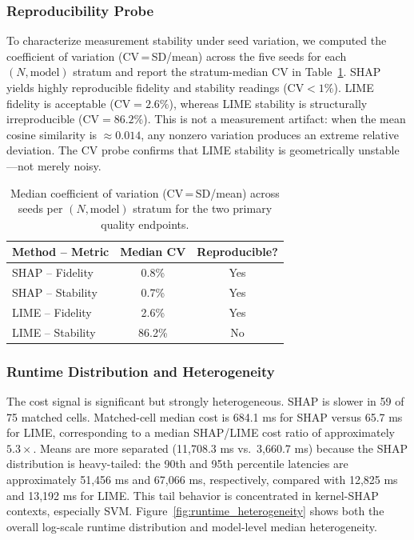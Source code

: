 \documentclass[twoside,11pt]{article}
\begin{document}
\subsubsection*{Reproducibility Probe}

To characterize measurement stability under seed variation, we computed
the coefficient of variation (CV\,=\,SD/mean) across the five seeds for
each $(N, \mathrm{model})$ stratum and report the stratum-median CV in
Table~\ref{tab:cv_reproducibility}. SHAP yields highly reproducible
fidelity and stability readings ($\mathrm{CV}<1\%$). LIME fidelity is
acceptable ($\mathrm{CV}=2.6\%$), whereas LIME stability is structurally
irreproducible ($\mathrm{CV}=86.2\%$). This is not a measurement artifact:
when the mean cosine similarity is $\approx 0.014$, any nonzero variation
produces an extreme relative deviation. The CV probe confirms that LIME
stability is geometrically unstable---not merely noisy.

\begin{table}[t]
\centering
\caption{Median coefficient of variation (CV\,=\,SD/mean) across seeds
per $(N, \mathrm{model})$ stratum for the two primary quality endpoints.}
\label{tab:cv_reproducibility}
\begin{tabular}{lcc}
\toprule
Method -- Metric    & Median CV & Reproducible? \\
\midrule
SHAP -- Fidelity    & 0.8\%     & Yes \\
SHAP -- Stability   & 0.7\%     & Yes \\
LIME -- Fidelity    & 2.6\%     & Yes \\
LIME -- Stability   & 86.2\%    & No  \\
\bottomrule
\end{tabular}
\end{table}

\subsubsection*{Runtime Distribution and Heterogeneity}

The cost signal is significant but strongly heterogeneous. SHAP is slower
in 59 of 75 matched cells. Matched-cell median cost is 684.1 ms for SHAP
versus 65.7 ms for LIME, corresponding to a median SHAP/LIME cost ratio
of approximately $5.3\times$. Means are more separated (11,708.3 ms vs.\
3,660.7 ms) because the SHAP distribution is heavy-tailed: the 90th and
95th percentile latencies are approximately 51,456 ms and 67,066 ms,
respectively, compared with 12,825 ms and 13,192 ms for LIME. This tail
behavior is concentrated in kernel-SHAP contexts, especially SVM.
Figure~\ref{fig:runtime_heterogeneity} shows both the overall log-scale
runtime distribution and model-level median heterogeneity.
\end{document}
